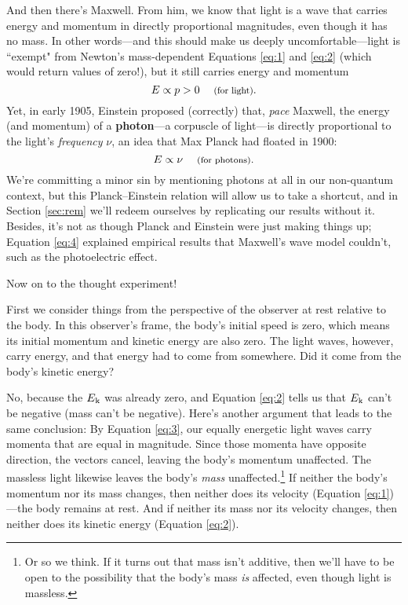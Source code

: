 \documentclass[12pt]{article}
\begin{document}
And then there's Maxwell. From him, we know that light is a wave that carries energy and momentum in directly proportional magnitudes, even though it has no mass. In other words---and this should make us deeply uncomfortable---light is ``exempt" from Newton's mass-dependent Equations \ref{eq:1} and \ref{eq:2} (which would return values of zero!), but it still carries energy and momentum
\begin{equation}\label{eq:3}
E \propto p >0 \quad \text{\footnotesize{ (for light)}} .
\end{equation}
Yet, in early 1905, Einstein proposed (correctly) that, \emph{pace} Maxwell, the energy (and momentum) of a \textbf{photon}---a corpuscle of light---is directly proportional to the light's \emph{frequency} $\nu$, an idea that Max Planck had floated in 1900:
\begin{equation}\label{eq:4}
E \propto \nu \quad \text{\footnotesize{ (for photons)}}.
\end{equation}
We're committing a minor sin by mentioning photons at all in our non-quantum context, but this Planck--Einstein relation will allow us to take a shortcut, and in Section \ref{sec:rem} we'll redeem ourselves by replicating our results without it. Besides, it's not as though Planck and Einstein were just making things up; Equation \ref{eq:4} explained empirical results that Maxwell's wave model couldn't, such as the photoelectric effect.

Now on to the thought experiment!

First we consider things from the perspective of the observer at rest relative to the body. In this observer's frame, the body's initial speed is zero, which means its initial momentum and kinetic energy are also zero. The light waves, however, carry energy, and that energy had to come from somewhere. Did it come from the body's kinetic energy?

No, because the $E_{\mkern.5mu \textrm{k}}$ was already zero, and Equation \ref{eq:2} tells us that $E_{\mkern.5mu \textrm{k}}$ can't be negative (mass can't be negative). Here's another argument that leads to the same conclusion: By Equation \ref{eq:3}, our equally energetic light waves carry momenta that are equal in magnitude. Since those momenta have opposite direction, the vectors cancel, leaving the body's momentum unaffected. The massless light likewise leaves the body's \emph{mass} unaffected.\footnote{\label{fn:ma}Or so we think. If it turns out that mass isn't additive, then we'll have to be open to the possibility that the body's mass \emph{is} affected, even though light is massless.} If neither the body's momentum nor its mass changes, then neither does its velocity (Equation \ref{eq:1})---the body remains at rest. And if neither its mass nor its velocity changes, then neither does its kinetic energy (Equation \ref{eq:2}).
\end{document}
